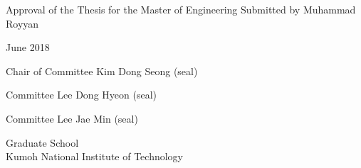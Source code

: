 \begin{titlepage}
	\begin{center}      
		\vspace*{2.5 cm}
		\begin{spacing}{1.5}
			{\fontsize{16}{25}\selectfont Approval of the Thesis for the Master of Engineering Submitted by Muhammad Royyan}
		\end{spacing}
		\vfill
		{\fontsize{14}{20}\selectfont June 2018}
		
		\vspace{1 cm}
		{\fontsize{14}{20}\selectfont Chair of Committee	Kim Dong Seong (seal)}
		
		\vspace{1 cm}
		{\fontsize{14}{20}\selectfont Committee	Lee Dong Hyeon (seal)}
		
		\vspace{1 cm}
		{\fontsize{14}{20}\selectfont Committee	Lee Jae Min (seal)}
		
		\vspace{2 cm}
		\begin{spacing}{1.5}
			{\fontsize{16}{25}\selectfont Graduate School \\ Kumoh National Institute of Technology}
		\end{spacing}
		\vspace*{1.5 cm}
	\end{center}
\end{titlepage}

